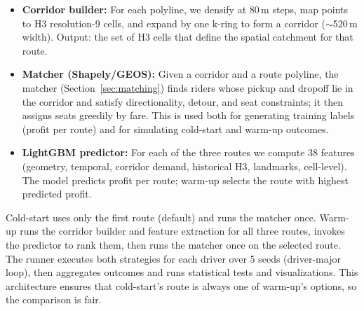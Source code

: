 \documentclass[11pt,a4paper]{article}
\begin{document}
\begin{itemize}
\item \textbf{Corridor builder:} For each polyline, we densify at 80\,m steps, map points to H3 resolution-9 cells, and expand by one k-ring to form a corridor ($\sim$520\,m width). Output: the set of H3 cells that define the spatial catchment for that route.
\item \textbf{Matcher (Shapely/GEOS):} Given a corridor and a route polyline, the matcher (Section~\ref{sec:matching}) finds riders whose pickup and dropoff lie in the corridor and satisfy directionality, detour, and seat constraints; it then assigns seats greedily by fare. This is used both for generating training labels (profit per route) and for simulating cold-start and warm-up outcomes.
\item \textbf{LightGBM predictor:} For each of the three routes we compute 38 features (geometry, temporal, corridor demand, historical H3, landmarks, cell-level). The model predicts profit per route; warm-up selects the route with highest predicted profit.
\end{itemize}

Cold-start uses only the first route (default) and runs the matcher once. Warm-up runs the corridor builder and feature extraction for all three routes, invokes the predictor to rank them, then runs the matcher once on the selected route. The runner executes both strategies for each driver over 5 seeds (driver-major loop), then aggregates outcomes and runs statistical tests and visualizations. This architecture ensures that cold-start's route is always one of warm-up's options, so the comparison is fair.
\end{document}

